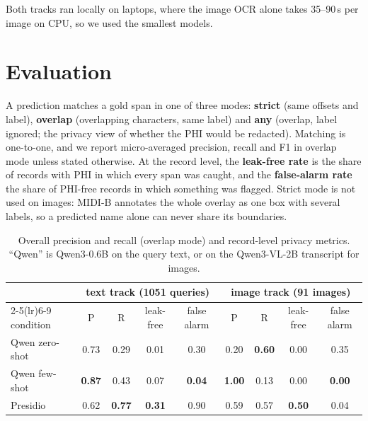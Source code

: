 \documentclass[11pt,a4paper]{article}
\begin{document}
 Both tracks ran locally on laptops, where the image OCR alone takes 35--90\,s per image on CPU, so we used the smallest models.

\section{Evaluation}

A prediction matches a gold span in one of three modes: \textbf{strict} (same offsets and label), \textbf{overlap} (overlapping characters, same label) and \textbf{any} (overlap, label ignored; the privacy view of whether the PHI would be redacted). Matching is one-to-one, and we report micro-averaged precision, recall and F1 in overlap mode unless stated otherwise. At the record level, the \textbf{leak-free rate} is the share of records with PHI in which every span was caught, and the \textbf{false-alarm rate} the share of PHI-free records in which something was flagged. Strict mode is not used on images: MIDI-B annotates the whole overlay as one box with several labels, so a predicted name alone can never share its boundaries.

\begin{table}[H]
\centering\small
\begin{tabular}{lcccccccc}
\toprule
 & \multicolumn{4}{c}{text track (1051 queries)} & \multicolumn{4}{c}{image track (91 images)} \\
\cmidrule(lr){2-5}\cmidrule(lr){6-9}
condition & P & R & leak-free & false alarm & P & R & leak-free & false alarm \\
\midrule
Qwen zero-shot & 0.73 & 0.29 & 0.01 & 0.30 & 0.20 & \textbf{0.60} & 0.00 & 0.35 \\
Qwen few-shot  & \textbf{0.87} & 0.43 & 0.07 & \textbf{0.04} & \textbf{1.00} & 0.13 & 0.00 & \textbf{0.00} \\
Presidio       & 0.62 & \textbf{0.77} & \textbf{0.31} & 0.90 & 0.59 & 0.57 & \textbf{0.50} & 0.04 \\
\bottomrule
\end{tabular}
\caption{Overall precision and recall (overlap mode) and record-level privacy metrics. ``Qwen'' is Qwen3-0.6B on the query text, or on the Qwen3-VL-2B transcript for images.}
\label{tab:overall}
\end{table}
\end{document}
